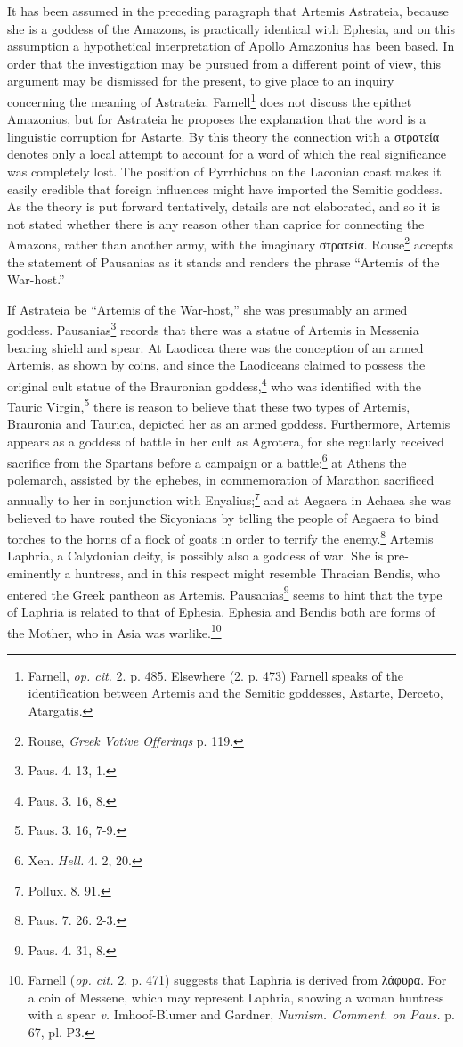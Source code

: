 \documentclass[a4paper, 12pt, oneside]{article}
\begin{document}
It has been assumed in the preceding paragraph that Artemis Astrateia, because she is a goddess of the Amazons, is practically identical with Ephesia, and on this assumption a hypothetical interpretation of Apollo Amazonius has been based. In order that the investigation may be pursued from a different point of view, this argument may be dismissed for the present, to give place to an inquiry concerning the meaning of Astrateia. Farnell\footnote{Farnell, \emph{op. cit.} 2. p. 485. Elsewhere (2. p. 473) Farnell speaks of the identification between Artemis and the Semitic goddesses, Astarte, Derceto, Atargatis.} does not discuss the epithet Amazonius, but for Astrateia he proposes the explanation that the word is a linguistic corruption for Astarte. By this theory the connection with a στρατεία denotes only a local attempt to account for a word of which the real significance was completely lost. The position of Pyrrhichus on the Laconian coast makes it easily credible that foreign influences might have imported the Semitic goddess. As the theory is put forward tentatively, details are not elaborated, and so it is not stated whether there is any reason other than caprice for connecting the Amazons, rather than another army, with the imaginary στρατεία. Rouse\footnote{Rouse, \emph{Greek Votive Offerings} p. 119.} accepts the statement of Pausanias as it stands and renders the phrase ``Artemis of the War-host.''

If Astrateia be ``Artemis of the War-host,'' she was presumably an armed goddess. Pausanias\footnote{Paus. 4. 13, 1.} records that there was a statue of Artemis in Messenia bearing shield and spear. At Laodicea there was the conception of an armed Artemis, as shown by coins, and since the Laodiceans claimed to possess the original cult statue of the Brauronian goddess,\footnote{Paus. 3. 16, 8.} who was identified with the Tauric Virgin,\footnote{Paus. 3. 16, 7-9.} there is reason to believe that these two types of Artemis, Brauronia and Taurica, depicted her as an armed goddess. Furthermore, Artemis appears as a goddess of battle in her cult as Agrotera, for she regularly received sacrifice from the Spartans before a campaign or a battle;\footnote{Xen. \emph{Hell.} 4. 2, 20.} at Athens the polemarch, assisted by the ephebes, in commemoration of Marathon sacrificed annually to her in conjunction with Enyalius;\footnote{Pollux. 8. 91.} and at Aegaera in Achaea she was believed to have routed the Sicyonians by telling the people of Aegaera to bind torches to the horns of a flock of goats in order to terrify the enemy.\footnote{Paus. 7. 26. 2-3.} Artemis Laphria, a Calydonian deity, is possibly also a goddess of war. She is pre-eminently a huntress, and in this respect might resemble Thracian Bendis, who entered the Greek pantheon as Artemis. Pausanias\footnote{Paus. 4. 31, 8.} seems to hint that the type of Laphria is related to that of Ephesia. Ephesia and Bendis both are forms of the Mother, who in Asia was warlike.\footnote{Farnell (\emph{op. cit.} 2. p. 471) suggests that Laphria is derived from λάφυρα. For a coin of Messene, which may represent Laphria, showing a woman huntress with a spear \emph{v.} Imhoof-Blumer and Gardner, \emph{Numism. Comment. on Paus.} p. 67, pl. P3.}
\end{document}
